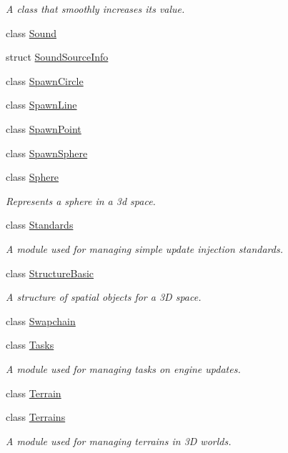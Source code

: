 \begin{DoxyCompactItemize}
\begin{DoxyCompactList}\small\item\em A class that smoothly increases its value. \end{DoxyCompactList}\item 
class \hyperlink{class_flounder_1_1_sound}{Sound}
\item 
struct \hyperlink{struct_flounder_1_1_sound_source_info}{Sound\+Source\+Info}
\item 
class \hyperlink{class_flounder_1_1_spawn_circle}{Spawn\+Circle}
\item 
class \hyperlink{class_flounder_1_1_spawn_line}{Spawn\+Line}
\item 
class \hyperlink{class_flounder_1_1_spawn_point}{Spawn\+Point}
\item 
class \hyperlink{class_flounder_1_1_spawn_sphere}{Spawn\+Sphere}
\item 
class \hyperlink{class_flounder_1_1_sphere}{Sphere}
\begin{DoxyCompactList}\small\item\em Represents a sphere in a 3d space. \end{DoxyCompactList}\item 
class \hyperlink{class_flounder_1_1_standards}{Standards}
\begin{DoxyCompactList}\small\item\em A module used for managing simple update injection standards. \end{DoxyCompactList}\item 
class \hyperlink{class_flounder_1_1_structure_basic}{Structure\+Basic}
\begin{DoxyCompactList}\small\item\em A structure of spatial objects for a 3D space. \end{DoxyCompactList}\item 
class \hyperlink{class_flounder_1_1_swapchain}{Swapchain}
\item 
class \hyperlink{class_flounder_1_1_tasks}{Tasks}
\begin{DoxyCompactList}\small\item\em A module used for managing tasks on engine updates. \end{DoxyCompactList}\item 
class \hyperlink{class_flounder_1_1_terrain}{Terrain}
\item 
class \hyperlink{class_flounder_1_1_terrains}{Terrains}
\begin{DoxyCompactList}\small\item\em A module used for managing terrains in 3D worlds. \end{DoxyCompactList}\item 

\end{DoxyCompactItemize}
